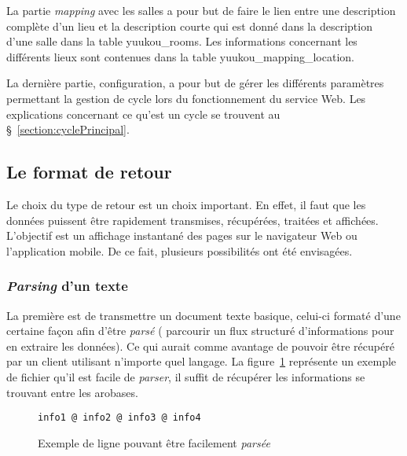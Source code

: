 La partie \textit{mapping} avec les salles a pour but de faire le lien entre une description compl\`ete d'un lieu et la description courte qui est donn\'e dans la description d'une salle dans la table \textsf{yuukou\_rooms}.
Les informations concernant les diff\'erents lieux sont contenues dans la table \textsf{yuukou\_mapping\_location}.

La derni\`ere partie, configuration, a pour but de g\'erer les diff\'erents param\`etres permettant la gestion de cycle lors du fonctionnement du service Web. 
Les explications concernant ce qu'est un cycle se trouvent au \S~\ref{section:cyclePrincipal}.

\subsection{Le format de retour}
\label{section:formatRetour}

Le choix du type de retour est un choix important.
En effet, il faut que les donn\'ees puissent \^etre rapidement transmises, r\'ecup\'er\'ees, trait\'ees et affich\'ees.
L'objectif est un affichage instantan\'e des pages sur le navigateur Web ou l'application mobile.
De ce fait, plusieurs possibilit\'es ont \'et\'e envisag\'ees.

\subsubsection{{\og}\textit{Parsing}{\fg} d'un texte}

La premi\`ere est de transmettre un document texte basique, celui-ci format\'e d'une certaine fa\c{c}on afin d'\^etre \textit{pars\'e} ({\cad} parcourir un flux structur\'e d'informations pour en extraire les donn\'ees).
Ce qui aurait comme avantage de pouvoir \^etre r\'ecup\'er\'e par un client utilisant n'importe quel langage.
La figure~\ref{code:exemplePlaintext} repr\'esente un exemple de fichier qu'il est facile de \textit{parser}, il suffit de r\'ecup\'erer les informations se trouvant entre les arobases.

\vspace{0.20cm}

\begin{figure}[!ht]
	\begin{lstlisting}[language=plaintext]
info1 @ info2 @ info3 @ info4
	\end{lstlisting}
	
	\caption{Exemple de ligne pouvant \^etre facilement \textit{pars\'ee}}
	\label{code:exemplePlaintext}

\end{figure}

